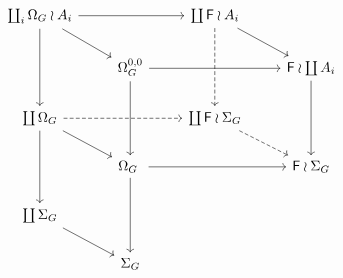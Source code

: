 \documentclass[a4paper,10pt]{article}%
\begin{document}
\[
\begin{tikzcd}
	\coprod_i \Omega_G \wr A_i \ar{rr} \ar{rd} \ar{dd}& &
	\coprod \Fin \wr A_i \ar{rd} \ar[dashed]{dd}
\\
	&
	\Omega_G^{0,0} \ar{rr} \ar{dd} & &
	\Fin \wr \coprod A_i \ar{dd}
\\
	\coprod \Omega_G \ar[dashed]{rr} \ar{rd} \ar{dd} & &
	\coprod \Fin \wr \Sigma_G \ar[dashed]{rd}
\\
	&
	\Omega_G \ar{rr} \ar{dd} \ & &
	\Fin \wr \Sigma_G
\\
	\coprod \Sigma_G \ar{rd}
\\
	& 
	\Sigma_G
\end{tikzcd}
\]





{}




\end{document}

